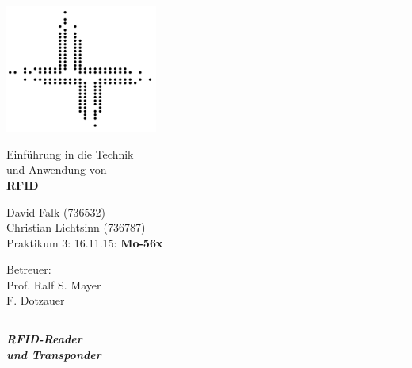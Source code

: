 \documentclass[paper=a4,fontsize=11pt,headsepline,footsepline,parskip=half]{scrartcl}
\begin{document}
\begin{titlepage}

\begin{minipage}[c]{5cm}
\includegraphics[width=5cm]{../logofbi}
\end{minipage}
\hfill
\begin{minipage}[c]{10cm}
\begin{flushright}
\Large Einführung in die Technik\\und Anwendung von\\
\LARGE \textbf{RFID}
\end{flushright}
\end{minipage}

\vspace*{1cm}

\begin{minipage}[c]{9cm}
\begin{flushleft}
\large David Falk (736532)\\Christian Lichtsinn (736787)\\Praktikum 3: 16.11.15: \textbf{Mo-56x}
\end{flushleft}
\end{minipage}
\hfill
\begin{minipage}[c]{7cm}
\begin{flushright}
\large Betreuer:\\Prof. Ralf S. Mayer\\F. Dotzauer
\end{flushright}
\end{minipage}

\vspace*{1cm}

\begingroup
  \setlength{\parskip}{0pt}%
  \setlength{\parindent}{0pt}%
  \setlength{\parfillskip}{0pt plus 1fil}%
  \par\rule{\linewidth}{1.5pt}\par
\endgroup


\centering
\Huge{\textbf{\textsl{RFID-Reader\\ und Transponder}}}


\end{titlepage}
\end{document}
